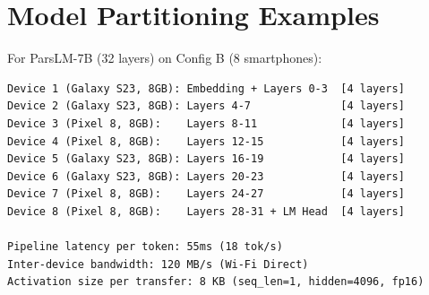 \documentclass[11pt,a4paper]{article}
\begin{document}
\section{Model Partitioning Examples}

For ParsLM-7B (32 layers) on Config B (8 smartphones):

\begin{lstlisting}[basicstyle=\small\ttfamily,frame=single,caption={Example Partition (ParsLM-7B on 8 devices)}]
Device 1 (Galaxy S23, 8GB): Embedding + Layers 0-3  [4 layers]
Device 2 (Galaxy S23, 8GB): Layers 4-7              [4 layers]
Device 3 (Pixel 8, 8GB):    Layers 8-11             [4 layers]
Device 4 (Pixel 8, 8GB):    Layers 12-15            [4 layers]
Device 5 (Galaxy S23, 8GB): Layers 16-19            [4 layers]
Device 6 (Galaxy S23, 8GB): Layers 20-23            [4 layers]
Device 7 (Pixel 8, 8GB):    Layers 24-27            [4 layers]
Device 8 (Pixel 8, 8GB):    Layers 28-31 + LM Head  [4 layers]

Pipeline latency per token: 55ms (18 tok/s)
Inter-device bandwidth: 120 MB/s (Wi-Fi Direct)
Activation size per transfer: 8 KB (seq_len=1, hidden=4096, fp16)
\end{lstlisting}
\end{document}
